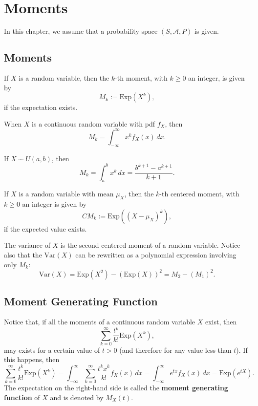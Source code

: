 
\chapter{Moments}

In this chapter, we assume that a probability space $(S, \mathcal{A}, P)$ is given.

\section{Moments}

\begin{definition}
If $X$ is a random variable, then the $k$-th moment, with $k \geq 0$ an integer, is given by
    \[
        M_k := \mathrm{Exp} (X^k ) ,
    \]
if the expectation exists.
\end{definition}

When $X$ is a continuous random variable with pdf $f_X$, then
    \[
        M_k = \int_{-\infty}^\infty x^k f_X (x) \, dx .
    \]

\begin{example}
If $X \sim U (a, b)$, then
    \[
        M_k = \int_a^b x^k \, dx = \frac{b^{k + 1} - a^{k + 1}}{k + 1} . \tag*{$\triangle$}
    \]
\end{example}

\begin{definition}
If $X$ is a random variable with mean $\mu_X$, then the $k$-th centered moment, with $k \geq 0$ an integer is given by
    \[
        CM_k := \mathrm{Exp} ( (X - \mu_X)^k) ,
    \]
if the expected value exists.
\end{definition}

The variance of $X$ is the second centered moment of a random variable. Notice also that the $\mathrm{Var} (X)$ can be rewritten as a polynomial expression involving only $M_k$:
    \[
        \mathrm{Var} (X) = \mathrm{Exp} (X^2) - (\mathrm{Exp} (X))^2 = M_2 - (M_1)^2 .
    \]

\section{Moment Generating Function}

Notice that, if all the moments of a continuous random variable $X$ exist, then
    \[
        \sum_{k = 0}^\infty \frac{t^k}{k!} \mathrm{Exp} (X^k) ,
    \]
may exists for a certain value of $t > 0$ (and therefore for any value less than $t$). If this happens, then
    \[
        \sum_{k = 0}^\infty \frac{t^k}{k!} \mathrm{Exp} (X^k) = \int_{-\infty}^\infty \sum_{k = 0}^\infty \frac{t^k x^k}{k!} f_X (x) \, dx = \int_{-\infty}^\infty e^{tx} f_X (x) \, dx = \mathrm{Exp} (e^{tX}) .
    \]
The expectation on the right-hand side is called the \textbf{moment generating function} of $X$ and is denoted by $M_X (t)$. 


